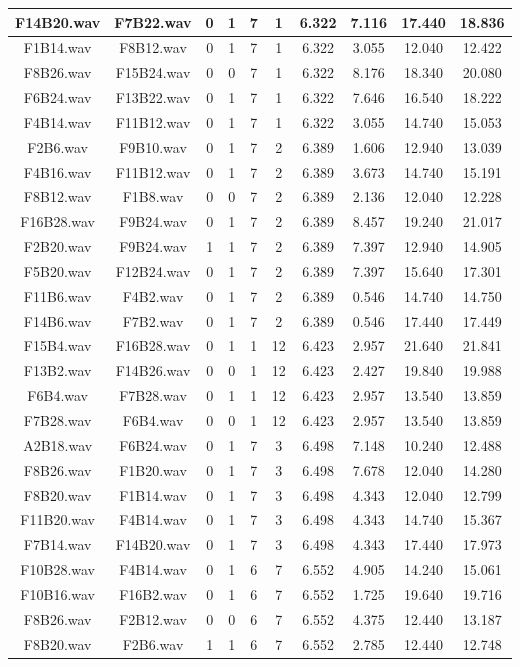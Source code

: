 \documentclass[11pt,a4paper,twoside]{book}
\begin{document}
\begin{longtable}[c]{|c|c|c|c|c|c|c|c|c|c|}
F14B20.wav&F7B22.wav&0&1&7&1&6.322&7.116&17.440&18.836\\ \hline
F1B14.wav&F8B12.wav&0&1&7&1&6.322&3.055&12.040&12.422\\ \hline
F8B26.wav&F15B24.wav&0&0&7&1&6.322&8.176&18.340&20.080\\ \hline
F6B24.wav&F13B22.wav&0&1&7&1&6.322&7.646&16.540&18.222\\ \hline
F4B14.wav&F11B12.wav&0&1&7&1&6.322&3.055&14.740&15.053\\ \hline
F2B6.wav&F9B10.wav&0&1&7&2&6.389&1.606&12.940&13.039\\ \hline
F4B16.wav&F11B12.wav&0&1&7&2&6.389&3.673&14.740&15.191\\ \hline
F8B12.wav&F1B8.wav&0&0&7&2&6.389&2.136&12.040&12.228\\ \hline
F16B28.wav&F9B24.wav&0&1&7&2&6.389&8.457&19.240&21.017\\ \hline
F2B20.wav&F9B24.wav&1&1&7&2&6.389&7.397&12.940&14.905\\ \hline
F5B20.wav&F12B24.wav&0&1&7&2&6.389&7.397&15.640&17.301\\ \hline
F11B6.wav&F4B2.wav&0&1&7&2&6.389&0.546&14.740&14.750\\ \hline
F14B6.wav&F7B2.wav&0&1&7&2&6.389&0.546&17.440&17.449\\ \hline
F15B4.wav&F16B28.wav&0&1&1&12&6.423&2.957&21.640&21.841\\ \hline
F13B2.wav&F14B26.wav&0&0&1&12&6.423&2.427&19.840&19.988\\ \hline
F6B4.wav&F7B28.wav&0&1&1&12&6.423&2.957&13.540&13.859\\ \hline
F7B28.wav&F6B4.wav&0&0&1&12&6.423&2.957&13.540&13.859\\ \hline
A2B18.wav&F6B24.wav&0&1&7&3&6.498&7.148&10.240&12.488\\ \hline
F8B26.wav&F1B20.wav&0&1&7&3&6.498&7.678&12.040&14.280\\ \hline
F8B20.wav&F1B14.wav&0&1&7&3&6.498&4.343&12.040&12.799\\ \hline
F11B20.wav&F4B14.wav&0&1&7&3&6.498&4.343&14.740&15.367\\ \hline
F7B14.wav&F14B20.wav&0&1&7&3&6.498&4.343&17.440&17.973\\ \hline
F10B28.wav&F4B14.wav&0&1&6&7&6.552&4.905&14.240&15.061\\ \hline
F10B16.wav&F16B2.wav&0&1&6&7&6.552&1.725&19.640&19.716\\ \hline
F8B26.wav&F2B12.wav&0&0&6&7&6.552&4.375&12.440&13.187\\ \hline
F8B20.wav&F2B6.wav&1&1&6&7&6.552&2.785&12.440&12.748\\ \hline

\end{longtable}
\end{document}
